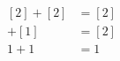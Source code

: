 \documentclass[preview]{standalone}
\begin{document}
\begin{align*}
\begin{aligned}[2] + [2] &= [2] \\[1] + [1] &= [2] \\1 + 1 &= 1 \end{aligned}
\end{align*}
\end{document}
